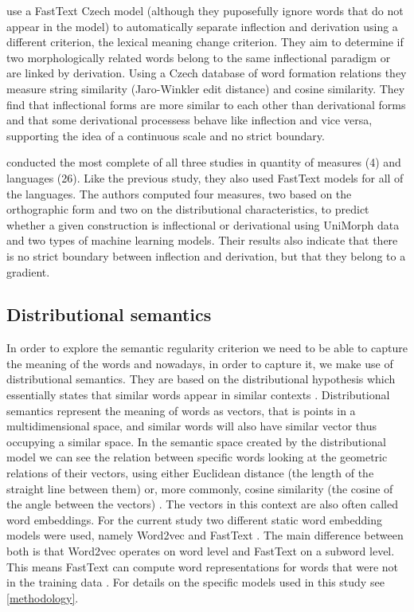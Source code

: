 \documentclass[12pt]{article}
\begin{document}
\textcite{rosa2019AttemptingSeparateInflection} use a FastText Czech model (although they puposefully ignore words that do not appear in the model) to automatically separate inflection and derivation using a different criterion, the lexical meaning change criterion. They aim to determine if two morphologically related words belong to the same inflectional paradigm or are linked by derivation. Using a Czech database of word formation relations they measure string similarity (Jaro-Winkler edit distance) and cosine similarity. They find that inflectional forms are more similar to each other than derivational forms and that some derivational processess behave like inflection and vice versa, supporting the idea of a continuous scale and no strict boundary.

\textcite{haley2024CorpusbasedMeasuresDiscriminate} conducted the most complete of all three studies in quantity of measures (4) and languages (26). Like the previous study, they also used FastText models for all of the languages. The authors computed four measures, two based on the orthographic form and two on the distributional characteristics, to predict whether a given construction is inflectional or derivational using UniMorph data and two types of machine learning models. Their results also indicate that there is no strict boundary between inflection and derivation, but that they belong to a gradient.

\subsection{Distributional semantics} \label{distributional-semantics}
In order to explore the semantic regularity criterion we need to be able to capture the meaning of the words and nowadays, in order to capture it, we make use of distributional semantics. They are based on the distributional hypothesis which essentially states that similar words appear in similar contexts \parencite{boleda2020DistributionalSemanticsLinguistic}. Distributional semantics represent the meaning of words as vectors, that is points in a multidimensional space, and similar words will also have similar vector thus occupying a similar space. In the semantic space created by the distributional model we can see the relation between specific words looking at the geometric relations of their vectors, using either Euclidean distance (the length of the straight line between them) or, more commonly, cosine similarity (the cosine of the angle between the vectors) \parencite{boleda2020DistributionalSemanticsLinguistic,chandrasekaran2021EvolutionSemanticSimilarity}. The vectors in this context are also often called word embeddings. For the current study two different static word embedding models were used, namely Word2vec \parencite{mikolov2013EfficientEstimationWord} and FastText \parencite{bojanowski2017EnrichingWordVectors}. The main difference between both is that Word2vec operates on word level and FastText on a subword level. This means FastText can compute word representations for words that were not in the training data \parencite{bojanowski2017EnrichingWordVectors}. %
For details on the specific models used in this study see \autoref{methodology}.
\end{document}
